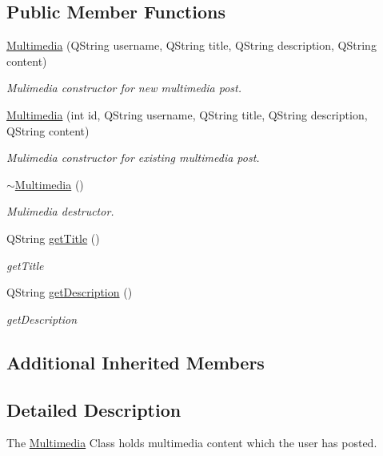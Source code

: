 \subsection*{Public Member Functions}
\begin{DoxyCompactItemize}
\item 
\hyperlink{classMultimedia_afa5fd55e64ebe8e78cbc338da1c25dee}{Multimedia} (Q\+String username, Q\+String title, Q\+String description, Q\+String content)
\begin{DoxyCompactList}\small\item\em Mulimedia constructor for new multimedia post. \end{DoxyCompactList}\item 
\hyperlink{classMultimedia_ae036bf701057bdc18cf8da98e385640a}{Multimedia} (int id, Q\+String username, Q\+String title, Q\+String description, Q\+String content)
\begin{DoxyCompactList}\small\item\em Mulimedia constructor for existing multimedia post. \end{DoxyCompactList}\item 
\hyperlink{classMultimedia_ab280f9ce1d0a1291c9b1ab876e854c94}{$\sim$\+Multimedia} ()\hypertarget{classMultimedia_ab280f9ce1d0a1291c9b1ab876e854c94}{}\label{classMultimedia_ab280f9ce1d0a1291c9b1ab876e854c94}

\begin{DoxyCompactList}\small\item\em Mulimedia destructor. \end{DoxyCompactList}\item 
Q\+String \hyperlink{classMultimedia_ab416f1220be623d85896acd1ca7d6b97}{get\+Title} ()
\begin{DoxyCompactList}\small\item\em get\+Title \end{DoxyCompactList}\item 
Q\+String \hyperlink{classMultimedia_aec725fe22cbeb3a0421de639b1299ce1}{get\+Description} ()
\begin{DoxyCompactList}\small\item\em get\+Description \end{DoxyCompactList}\end{DoxyCompactItemize}
\subsection*{Additional Inherited Members}


\subsection{Detailed Description}
The \hyperlink{classMultimedia}{Multimedia} Class holds multimedia content which the user has posted. 

